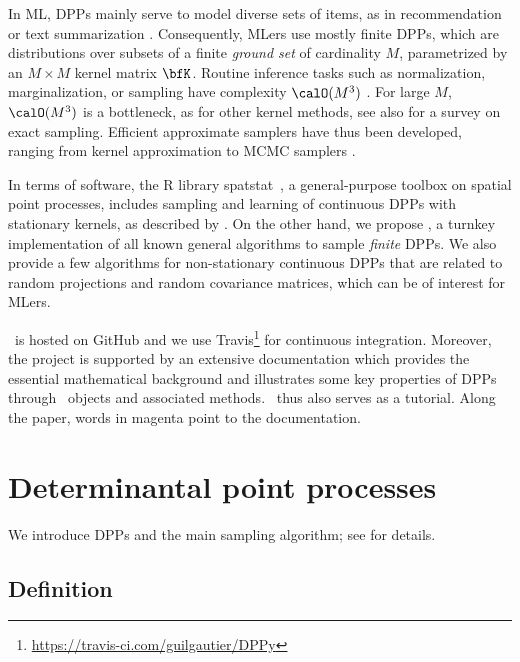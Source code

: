 \documentclass[twoside,11pt]{article}
\begin{document}
    In ML, DPPs mainly serve to model diverse sets of items, as in recommendation \citep{KaDeKo16, GaPaKo16} or text summarization \citep{DuBa18}.
    Consequently, MLers  use mostly finite DPPs, which are distributions over subsets of a finite \emph{ground set} of cardinality $M$, parametrized by an $M\times M$ kernel matrix $\bfK$.
    Routine inference tasks such as normalization, marginalization, or sampling have complexity $\calO(M^3)$ \citep{KuTa12}.
    For large $M$, $\calO(M^3)$ is a bottleneck, as for other kernel methods, see also \citet{TrBaAm18} for a survey on exact sampling.
    Efficient approximate samplers have thus been developed, ranging from kernel approximation \citep{AKFT13} to MCMC samplers \citep{AnGhRe16, LiJeSr16c, GaBaVa17}.

    In terms of software, the R library \textsf{spatstat}\ \citep{BaTu05}, a general-purpose toolbox on spatial point processes, includes sampling and learning of continuous DPPs with stationary kernels, as described by \citet{LaMoRu15}.
    On the other hand, we propose \DPPy, a turnkey implementation of all known general algorithms to sample \emph{finite} DPPs.
    We also provide a few algorithms for non-stationary continuous DPPs that are related to random projections and random covariance matrices, which can be of interest for MLers.

    \DPPy\ is hosted on GitHub\!
    and we use \setcounter{footnote}{5}Travis\footnote{\url{https://travis-ci.com/guilgautier/DPPy}} for continuous integration.
    Moreover, the project is supported by an extensive documentation which provides the essential mathematical background and illustrates some key properties of DPPs through \DPPy\ objects and associated methods.
    \DPPy\ thus also serves as a tutorial.
    Along the paper, words in magenta point to the documentation.


\section{Determinantal point processes} %
\label{sec:determinantal_point_processes}

    We introduce DPPs and the main sampling algorithm; see \citet{HKPV06} for details.

    \subsection{Definition} %
    \label{sub:definition}
\end{document}
